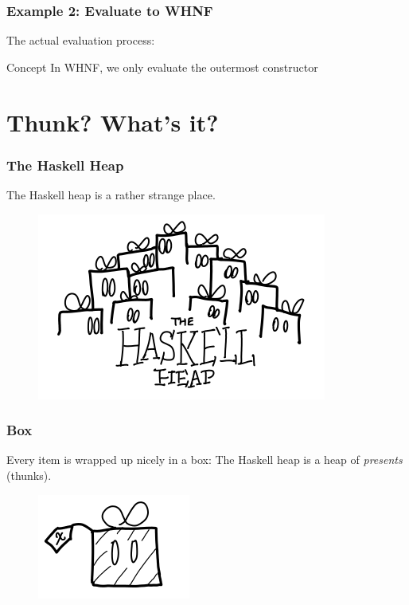 \documentclass{beamer}
\begin{document}

\begin{frame}
\frametitle{Example 2: Evaluate to WHNF}
The actual evaluation process:
\newline
{}

\begin{block}{Concept}
In WHNF, we only evaluate the outermost constructor
\end{block}
\end{frame}


\section{Thunk? What's it?}

\begin{frame}
\frametitle{The Haskell Heap}
\begin{center}
    The Haskell heap is a rather strange place.
\end{center}
\begin{figure}[hbt!]
    \centering
    \includegraphics[height=0.5\textheight]{./pic/haskell-heap.png}
\end{figure}
\end{frame}


\begin{frame}
\frametitle{Box}
Every item is wrapped up nicely in a box:\newline
The Haskell heap is a heap of \textit{presents} (thunks).
\begin{figure}[hbt!]
    \centering
    \includegraphics[height=0.4\textheight]{./pic/thunk.png}
\end{figure}
\end{frame}
\end{document}
